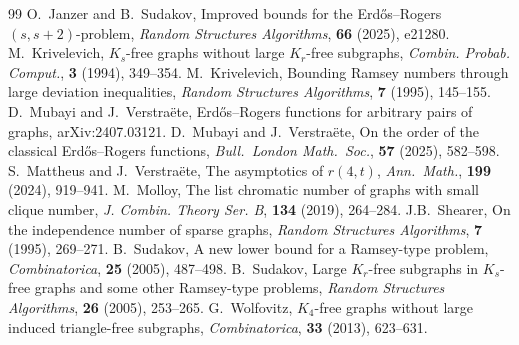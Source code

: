 \documentclass[10pt,a4paper]{amsart}
\numberwithin{theorem}{section}
\renewcommand{\(}{\bigl(}
\renewcommand{\)}{\bigr)\vphantom{)}}
\begin{document}
\begin{thebibliography}{99}
 O.~Janzer and B.~Sudakov, Improved bounds for the Erd\H{o}s--Rogers $(s,s+2)$-problem, \emph{Random Structures Algorithms}, \textbf{66} (2025), e21280.
 M.~Krivelevich, $K_s$-free graphs without large $K_r$-free subgraphs, \emph{Combin. Probab. Comput.}, \textbf{3} (1994), 349--354.
 M.~Krivelevich, Bounding Ramsey numbers through large deviation inequalities, \emph{Random Structures Algorithms}, \textbf{7} (1995), 145--155.
 D.~Mubayi and J.~Verstra{\"e}te, Erd{\H{o}}s--Rogers functions for arbitrary pairs of graphs, arXiv:2407.03121.
 D.~Mubayi and J.~Verstra\"ete, On the order of the classical Erd\H{o}s--Rogers functions, \emph{Bull.~London Math.~Soc.}, \textbf{57} (2025), 582--598.
 S.~Mattheus and J.~Verstra\"ete, The asymptotics of $r(4,t)$, \emph{Ann.~Math.}, \textbf{199} (2024), 919--941.
 M.~Molloy, The list chromatic number of graphs with small clique number, \emph{J. Combin. Theory Ser. B}, \textbf{134} (2019), 264--284.
 J.B.~Shearer, On the independence number of sparse graphs, \emph{Random Structures Algorithms}, \textbf{7} (1995), 269--271.
 B.~Sudakov, A new lower bound for a Ramsey-type problem, \emph{Combinatorica}, \textbf{25} (2005), 487--498.
 B.~Sudakov, Large $K_r$-free subgraphs in $K_s$-free graphs and some other Ramsey-type problems, \emph{Random Structures Algorithms}, \textbf{26} (2005), 253--265.
 G.~Wolfovitz, $K_4$-free graphs without large induced triangle-free subgraphs, \emph{Combinatorica}, \textbf{33} (2013), 623--631.
\end{thebibliography}
\end{document}
